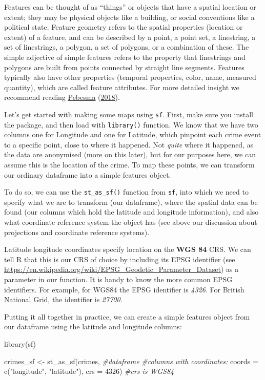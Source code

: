 \documentclass[
]{book}
\newenvironment{Shaded}{\begin{snugshade}}{\end{snugshade}}
\newcommand{\AttributeTok}[1]{\textcolor[rgb]{0.77,0.63,0.00}{#1}}
\newcommand{\CommentTok}[1]{\textcolor[rgb]{0.56,0.35,0.01}{\textit{#1}}}
\newcommand{\DecValTok}[1]{\textcolor[rgb]{0.00,0.00,0.81}{#1}}
\newcommand{\FunctionTok}[1]{\textcolor[rgb]{0.00,0.00,0.00}{#1}}
\newcommand{\NormalTok}[1]{#1}
\newcommand{\OtherTok}[1]{\textcolor[rgb]{0.56,0.35,0.01}{#1}}
\newcommand{\StringTok}[1]{\textcolor[rgb]{0.31,0.60,0.02}{#1}}
\begin{document}
Features can be thought of as ``things'' or objects that have a spatial location or extent; they may be physical objects like a building, or social conventions like a political state. Feature geometry refers to the spatial properties (location or extent) of a feature, and can be described by a point, a point set, a linestring, a set of linestrings, a polygon, a set of polygons, or a combination of these. The simple adjective of simple features refers to the property that linestrings and polygons are built from points connected by straight line segments. Features typically also have other properties (temporal properties, color, name, measured quantity), which are called feature attributes. For more detailed insight we recommend reading \protect\hyperlink{ref-Pebesma_2018}{Pebesma} (\protect\hyperlink{ref-Pebesma_2018}{2018}).

Let's get started with making some maps using \texttt{sf}. First, make sure you install the package, and then load with \texttt{library()} function. We know that we have two columns one for Longitude and one for Latitude, which pinpoint each crime event to a specific point, close to where it happened. Not \emph{quite} where it happened, as the data are anonymised (more on this later), but for our purposes here, we can assume this is the location of the crime. To map these points, we can transform our ordinary dataframe into a simple features object.

To do so, we can use the \texttt{st\_as\_sf()} function from \texttt{sf}, into which we need to specify what we are to transform (our dataframe), where the spatial data can be found (our columns which hold the latitude and longitude information), and also what coordinate reference system the object has (see above our discussion about projections and coordinate reference systems).

Latitude longitude coordinates specify location on the \textbf{WGS 84} CRS. We can tell R that this is our CRS of choice by including its EPSG identifier
(see \url{https://en.wikipedia.org/wiki/EPSG_Geodetic_Parameter_Dataset}) as a parameter in our function. It is handy to know the more common EPSG identifiers. For example, for WGS84 the EPSG identifier is \emph{4326}. For British National Grid, the identifier is \emph{27700}.

Putting it all together in practice, we can create a simple features object from our dataframe using the latitude and longitude columns:

\begin{Shaded}
\begin{Highlighting}[]
\FunctionTok{library}\NormalTok{(sf)}

\NormalTok{crimes\_sf }\OtherTok{\textless{}{-}} \FunctionTok{st\_as\_sf}\NormalTok{(crimes,   }\CommentTok{\#dataframe}
                      \CommentTok{\#columns with coordinates:}
                      \AttributeTok{coords =} \FunctionTok{c}\NormalTok{(}\StringTok{"longitude"}\NormalTok{, }\StringTok{"latitude"}\NormalTok{), }
                      \AttributeTok{crs =} \DecValTok{4326}\NormalTok{)   }\CommentTok{\#crs is WGS84}
\end{Highlighting}
\end{Shaded}
\end{document}
